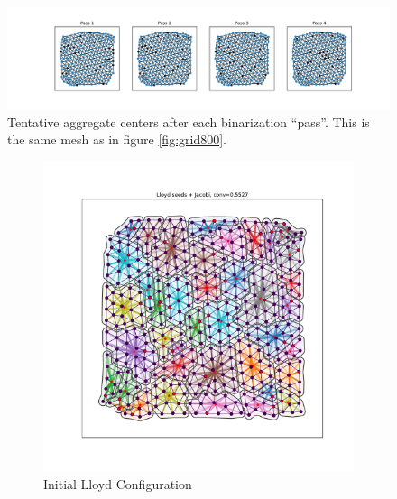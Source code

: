 \documentclass{article}
\begin{document}
\begin{figure}[h]
  \centering
  \includegraphics[width=\textwidth, trim=120 0 100 0, clip]{grid_800_agg_pass.pdf}
  \caption{Tentative aggregate centers after each binarization ``pass''.  This is the same mesh as in figure \ref{fig:grid800}.}
\end{figure}

\begin{figure}[h]
  \centering
  \begin{subfigure}[t]{0.32\textwidth}
    \centering
    \includegraphics[width=\textwidth, trim=80 70 70 50, clip]{grid_largest_dumb.pdf}
    \caption{Initial Lloyd Configuration}
  \end{subfigure}
  \begin{subfigure}[t]{0.32\textwidth}
    \centering

\end{subfigure}
\end{figure}
\end{document}
